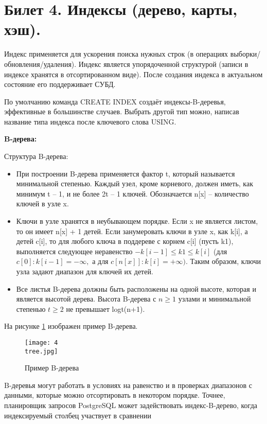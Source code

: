 \newpage
\section {Билет 4. Индексы (дерево, карты, хэш).}

Индекс применяется для ускорения поиска нужных строк (в операциях
выборки/обновления/удаления). Индекс является упорядоченной структурой (записи в индексе хранятся в отсортированном виде). После создания индекса в актуальном состояние его поддерживает СУБД.

По умолчанию команда CREATE INDEX создаёт индексы-B-деревья, эффективные в большинстве случаев. Выбрать другой тип можно, написав название типа индекса после ключевого слова USING. 

\textbf{B-дерева:} 

Структура B-дерева: 
\begin{itemize}
    \item При построении B-дерева применяется фактор t, который называется минимальной степенью. Каждый узел, кроме корневого, должен иметь, как минимум t – 1, и не более 2t – 1 ключей. Обозначается n[x] – количество ключей в узле x.
    \item Ключи в узле хранятся в неубывающем порядке. Если x не является листом, то он имеет n[x] + 1 детей. Если занумеровать ключи в узле x, как k[i], а детей c[i], то для любого ключа в поддереве с корнем c[i] (пусть k1), выполняется следующее неравенство $-k[i-1] \leq k1 \leq k[i]$ (для $c[0]: k[i-1] = -\infty,$ а для $c[n[x]]: k[i] = +\infty)$. Таким образом, ключи узла задают диапазон для ключей их детей.
    \item Все листья B-дерева должны быть расположены на одной высоте, которая и является высотой дерева. Высота B-дерева с $n \geq 1$ узлами и минимальной степенью $t\geq 2$ не превышает logt(n+1).
\end{itemize}

На рисунке \ref{fig:tree} изображен пример B-дерева. 

\begin{figure}[!h]
    \centering
    \texttt{[image: 4\\tree.jpg]}
     \label{fig:tree}
    \caption{Пример B-дерева}
\end{figure}


B-деревья могут работать в условиях на равенство и в проверках диапазонов с данными, которые можно отсортировать в некотором порядке. Точнее, планировщик запросов PostgreSQL может задействовать индекс-B-дерево, когда индексируемый столбец участвует в сравнении 

